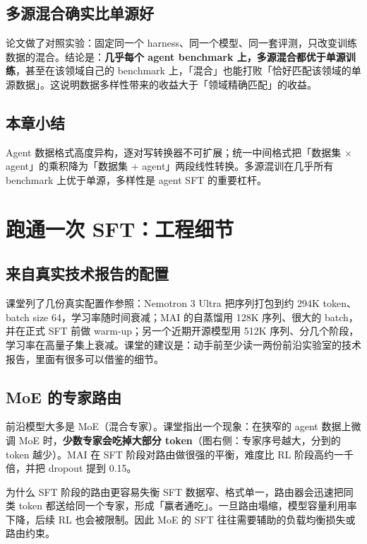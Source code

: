 \documentclass[a4paper]{article}
\begin{document}
\subsection{多源混合确实比单源好}

论文做了对照实验：固定同一个 harness、同一个模型、同一套评测，只改变训练数据的混合。结论是：\textbf{几乎每个 agent benchmark 上，多源混合都优于单源训练}，甚至在该领域自己的 benchmark 上，「混合」也能打败「恰好匹配该领域的单源数据」。这说明数据多样性带来的收益大于「领域精确匹配」的收益。

\subsection{本章小结}
Agent 数据格式高度异构，逐对写转换器不可扩展；统一中间格式把「数据集 $\times$ agent」的乘积降为「数据集 + agent」两段线性转换。多源混训在几乎所有 benchmark 上优于单源，多样性是 agent SFT 的重要杠杆。

\section{跑通一次 SFT：工程细节}

\subsection{来自真实技术报告的配置}

课堂列了几份真实配置作参照：Nemotron 3 Ultra 把序列打包到约 294K token、batch size 64，学习率随时间衰减；MAI 的自蒸馏用 128K 序列、很大的 batch，并在正式 SFT 前做 warm-up；另一个近期开源模型用 512K 序列、分几个阶段，学习率在高量子集上衰减。课堂的建议是：动手前至少读一两份前沿实验室的技术报告，里面有很多可以借鉴的细节。

\subsection{MoE 的专家路由}

前沿模型大多是 MoE（混合专家）。课堂指出一个现象：在狭窄的 agent 数据上微调 MoE 时，\textbf{少数专家会吃掉大部分 token}（图右侧：专家序号越大，分到的 token 越少）。MAI 在 SFT 阶段对路由做很强的平衡，难度比 RL 阶段高约一千倍，并把 dropout 提到 0.15。

\begin{knowledgebox}{为什么 SFT 阶段的路由更容易失衡}
SFT 数据窄、格式单一，路由器会迅速把同类 token 都送给同一个专家，形成「赢者通吃」。一旦路由塌缩，模型容量利用率下降，后续 RL 也会被限制。因此 MoE 的 SFT 往往需要辅助的负载均衡损失或路由约束。
\end{knowledgebox}
\end{document}
